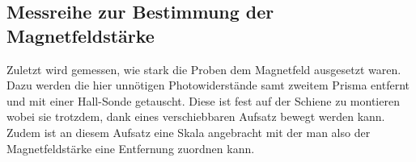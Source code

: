 \subsection{Messreihe zur Bestimmung der Magnetfeldstärke}
Zuletzt wird gemessen, wie stark die Proben dem Magnetfeld ausgesetzt waren. 
Dazu werden die hier unnötigen Photowiderstände samt zweitem Prisma entfernt und mit einer Hall-Sonde 
getauscht. Diese ist fest auf der Schiene zu montieren wobei sie trotzdem, dank eines verschiebbaren 
Aufsatz bewegt werden kann. Zudem ist an diesem Aufsatz eine Skala angebracht mit der man also der Magnetfeldstärke
eine Entfernung zuordnen kann.

